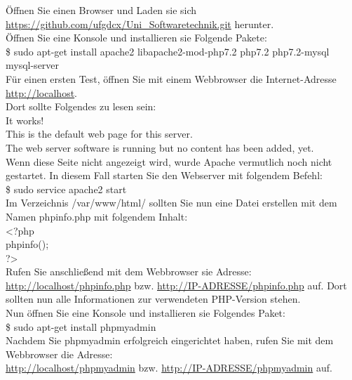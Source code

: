 \documentclass{Handbuch}
\begin{document}
Öffnen Sie einen Browser und Laden sie sich \url{https://github.com/ufgdcx/Uni_Softwaretechnik.git} herunter.\\
Öffnen Sie eine Konsole und installieren sie Folgende Pakete:\\

\$ sudo apt-get install apache2 libapache2-mod-php7.2 php7.2 php7.2-mysql mysql-server\\

Für einen ersten Test, öffnen Sie mit einem Webbrowser die Internet-Adresse \url{http://localhost}.\\
Dort sollte Folgendes zu lesen sein:\\

	It works!\\
	This is the default web page for this server.\\
	The web server software is running but no content has been added, yet.\\

Wenn diese Seite nicht angezeigt wird, wurde Apache vermutlich noch nicht gestartet. In diesem Fall starten Sie den Webserver mit folgendem Befehl:\\

\$ sudo service apache2 start\\

Im Verzeichnis /var/www/html/ sollten Sie nun eine Datei erstellen mit dem Namen phpinfo.php mit folgendem Inhalt:\\

\textless ?php\\
phpinfo();\\
?\textgreater \\

Rufen Sie anschließend mit dem Webbrowser sie Adresse: \url{http://localhost/phpinfo.php} bzw. \url{http://IP-ADRESSE/phpinfo.php}
auf. Dort sollten nun alle Informationen zur verwendeten PHP-Version stehen.\\

Nun öffnen Sie eine Konsole und installieren sie Folgendes Paket:\\

\$ sudo apt-get install phpmyadmin\\

Nachdem Sie phpmyadmin erfolgreich eingerichtet haben, rufen Sie mit dem Webbrowser die Adresse: \\
\url{http://localhost/phpmyadmin} bzw. \url{http://IP-ADRESSE/phpmyadmin} auf.\\
\end{document}
